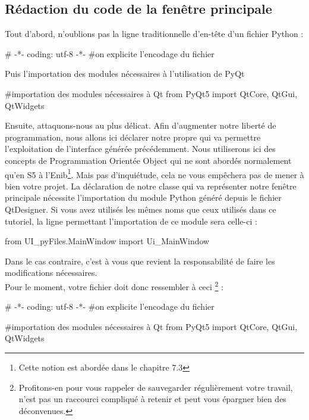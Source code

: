 {

\subsection{Rédaction du code de la fenêtre principale}

Tout d'abord, n'oublions pas la ligne traditionnelle d'en-tête d'un fichier Python :
\begin{Python}
# -*- coding: utf-8 -*-
#on explicite l'encodage du fichier
\end{Python}
Puis l'importation des modules nécessaires à l'utilisation de PyQt
\begin{Python}
#importation des modules nécessaires à Qt
from PyQt5 import QtCore, QtGui, QtWidgets
\end{Python}

Ensuite, attaquons-nous au plus délicat.\newline
Afin d'augmenter notre liberté de programmation, nous allons ici déclarer notre propre  qui va permettre l'exploitation de l'interface générée précédemment. Nous utiliserons ici des concepts de Programmation Orientée Object qui ne sont abordés normalement qu'en S5 à l'Enib\footnote{Cette notion est abordée dans le chapitre 7.3}. Mais pas d'inquiétude, cela ne vous empêchera pas de mener à bien votre projet.\newline
La déclaration de notre classe qui  va représenter notre fenêtre principale nécessite l'importation du module Python généré depuis le fichier QtDesigner. Si vous avez utilisés les mêmes noms que ceux utilisés dans ce tutoriel, la ligne permettant l'importation de ce module sera celle-ci :
\begin{Python}
from UI_pyFiles.MainWindow import Ui_MainWindow
\end{Python}
Dans le cas contraire, c'est à vous que revient la responsabilité de faire les modifications nécessaires.\\ 


Pour le moment, votre fichier doit donc ressembler à ceci
\footnote{ Profitons-en pour vous rappeler de sauvegarder régulièrement votre travail,  n'est pas un raccourci compliqué à retenir et peut vous épargner bien des déconvenues.}
:
\begin{Python}
# -*- coding: utf-8 -*-
#on explicite l’encodage du fichier

#importation des modules nécessaires à Qt
from PyQt5 import QtCore, QtGui, QtWidgets


\end{Python}}
